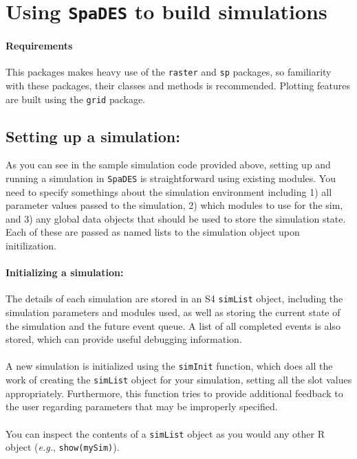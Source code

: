 \documentclass{article}
\begin{document}
\newpage

\section{Using \texttt{SpaDES} to build simulations}

\paragraph{Requirements}
This packages makes heavy use of the \texttt{raster} and \texttt{sp} packages, so familiarity with these packages, their classes and methods is recommended. Plotting features are built using the \texttt{grid} package.

\subsection{Setting up a simulation:}
As you can see in the sample simulation code provided above, setting up and running a simulation in \texttt{SpaDES} is straightforward using existing modules. You need to specify somethings about the simulation environment including 1) all parameter values passed to the simulation, 2) which modules to use for the sim, and 3) any global data objects that should be used to store the simulation state. Each of these are passed as named lists to the simulation object upon initilization.

\paragraph{Initializing a simulation:}
The details of each simulation are stored in an S4 \texttt{simList} object, including the simulation parameters and modules used, as well as storing the current state of the simulation and the future event queue. A list of all completed events is also stored, which can provide useful debugging information.

\paragraph{}
A new simulation is initialized using the \texttt{simInit} function, which does all the work of creating the \texttt{simList} object for your simulation, setting all the slot values appropriately. Furthermore, this function tries to provide additional feedback to the user regarding parameters that may be improperly specified.

\paragraph{}
You can inspect the contents of a \texttt{simList} object as you would any other \textsf{R} object (\textit{e.g.}, \texttt{show(mySim)}).
\end{document}
